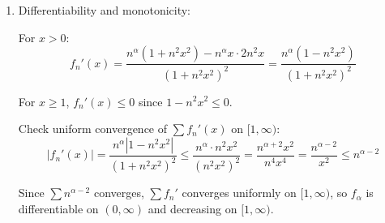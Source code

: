 \documentclass[12pt]{article}
\begin{document}
\begin{answerbox}
\begin{enumerate}
\begin{enumerate}
        At $x=0$: $f_n(0)=0$ and $f_\alpha(0)=0$. Need to check continuity at 0.
        
        \item For $x = \frac{1}{N}$:
        \[
        f_\alpha\left(\frac{1}{N}\right) = \sum_{n=1}^\infty \frac{n^\alpha \cdot \frac{1}{N}}{1 + n^2 \cdot \frac{1}{N^2}} = N \sum_{n=1}^\infty \frac{n^\alpha}{N^2 + n^2}
        \]
        
        So:
        \[
        f_\alpha\left(\frac{1}{N}\right) \geq N \sum_{n=1}^N \frac{n^\alpha}{N^2 + n^2} \geq N \sum_{n=1}^N \frac{n^\alpha}{N^2 + N^2} = \frac{1}{2N} \sum_{n=1}^N n^\alpha
        \]
        
        For $0 \leq \alpha < 1$, $\sum_{n=1}^N n^\alpha \sim \frac{N^{\alpha+1}}{\alpha+1}$.
        
        So:
        \[
        f_\alpha\left(\frac{1}{N}\right) \gtrsim \frac{1}{2N} \cdot \frac{N^{\alpha+1}}{\alpha+1} = \frac{1}{2(\alpha+1)} N^\alpha
        \]
        
        Since $\alpha \geq 0$, $N^\alpha \geq 1$, so $f_\alpha\left(\frac{1}{N}\right)$ doesn't tend to 0 as $N \to \infty$.
        
        But $f_\alpha(0) = 0$, so $f_\alpha$ is discontinuous at 0.
        
        \item Uniform convergence on $\mathbb{R}_+$?
        
        No, because if the series converged uniformly on $\mathbb{R}_+$, the sum would be continuous at 0 (as each $f_n$ is continuous), but we just showed discontinuity at 0.
    \end{enumerate}
    
    \item Differentiability and monotonicity:
    
    For $x > 0$:
    \[
    f_n'(x) = \frac{n^\alpha(1 + n^2 x^2) - n^\alpha x \cdot 2n^2 x}{(1+n^2 x^2)^2} = \frac{n^\alpha(1 - n^2 x^2)}{(1+n^2 x^2)^2}
    \]
    
    For $x \geq 1$, $f_n'(x) \leq 0$ since $1 - n^2 x^2 \leq 0$.
    
    Check uniform convergence of $\sum f_n'(x)$ on $[1, \infty)$:
    \[
    |f_n'(x)| = \frac{n^\alpha |1 - n^2 x^2|}{(1+n^2 x^2)^2} \leq \frac{n^\alpha \cdot n^2 x^2}{(n^2 x^2)^2} = \frac{n^{\alpha+2} x^2}{n^4 x^4} = \frac{n^{\alpha-2}}{x^2} \leq n^{\alpha-2}
    \]
    
    Since $\sum n^{\alpha-2}$ converges, $\sum f_n'$ converges uniformly on $[1, \infty)$, so $f_\alpha$ is differentiable on $(0, \infty)$ and decreasing on $[1, \infty)$.
\end{enumerate}
\end{answerbox}
\end{document}
